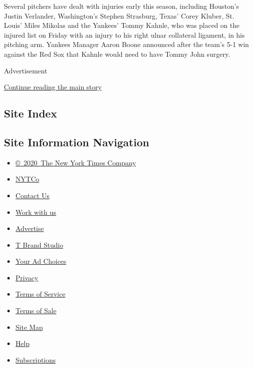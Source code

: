Several pitchers have dealt with injuries early this season, including
Houston's Justin Verlander, Washington's Stephen Strasburg, Texas' Corey
Kluber, St. Louis' Miles Mikolas and the Yankees' Tommy Kahnle, who was
placed on the injured list on Friday with an injury to his right ulnar
collateral ligament, in his pitching arm. Yankees Manager Aaron Boone
announced after the team's 5-1 win against the Red Sox that Kahnle would
need to have Tommy John surgery.

Advertisement

\protect\hyperlink{after-bottom}{Continue reading the main story}

\hypertarget{site-index}{%
\subsection{Site Index}\label{site-index}}

\hypertarget{site-information-navigation}{%
\subsection{Site Information
Navigation}\label{site-information-navigation}}

\begin{itemize}
\tightlist
\item
  \href{https://help.nytimes3xbfgragh.onion/hc/en-us/articles/115014792127-Copyright-notice}{©~2020~The
  New York Times Company}
\end{itemize}

\begin{itemize}
\tightlist
\item
  \href{https://www.nytco.com/}{NYTCo}
\item
  \href{https://help.nytimes3xbfgragh.onion/hc/en-us/articles/115015385887-Contact-Us}{Contact
  Us}
\item
  \href{https://www.nytco.com/careers/}{Work with us}
\item
  \href{https://nytmediakit.com/}{Advertise}
\item
  \href{http://www.tbrandstudio.com/}{T Brand Studio}
\item
  \href{https://www.nytimes3xbfgragh.onion/privacy/cookie-policy\#how-do-i-manage-trackers}{Your
  Ad Choices}
\item
  \href{https://www.nytimes3xbfgragh.onion/privacy}{Privacy}
\item
  \href{https://help.nytimes3xbfgragh.onion/hc/en-us/articles/115014893428-Terms-of-service}{Terms
  of Service}
\item
  \href{https://help.nytimes3xbfgragh.onion/hc/en-us/articles/115014893968-Terms-of-sale}{Terms
  of Sale}
\item
  \href{https://spiderbites.nytimes3xbfgragh.onion}{Site Map}
\item
  \href{https://help.nytimes3xbfgragh.onion/hc/en-us}{Help}
\item
  \href{https://www.nytimes3xbfgragh.onion/subscription?campaignId=37WXW}{Subscriptions}
\end{itemize}
